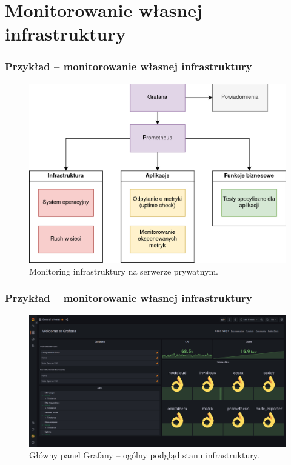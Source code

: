 \documentclass[]{beamer}
\begin{document}
\section{Monitorowanie własnej infrastruktury}

\begin{frame}
  \frametitle{Przykład -- monitorowanie własnej infrastruktury}
  \begin{figure}
    \centering
    \includegraphics[width=0.8\linewidth]{infra.png}
    \caption{Monitoring infrastruktury na serwerze prywatnym.}
  \end{figure}
\end{frame}

\begin{frame}
  \frametitle{Przykład -- monitorowanie własnej infrastruktury}
  \begin{figure}
    \centering
    \includegraphics[width=1.0\linewidth]{grafana_dashboard_main.jpg}
    \caption{Główny panel Grafany -- ogólny podgląd stanu infrastruktury.}
  \end{figure}
\end{frame}
\end{document}

